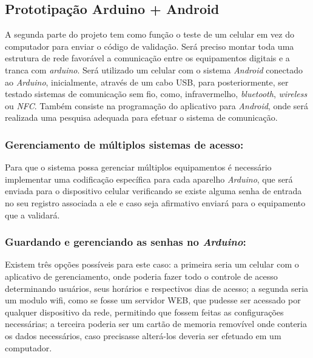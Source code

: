 \documentclass[12pt]{article}
\begin{document}
\subsection{Prototipação Arduino + Android}

	A segunda parte do projeto tem como função o teste de um celular em vez do computador para enviar o código de validação. Será preciso montar toda uma estrutura de rede favorável a comunicação entre os equipamentos digitais e a tranca com \textit{arduino}.\cite{igoe2011making} Será utilizado um celular com o sistema \textit{Android} conectado ao \textit{Arduino}, inicialmente, através de um cabo USB, para posteriormente, ser testado sistemas de comunicação sem fio, como, infravermelho, \textit{bluetooth}, \textit{wireless} ou \textit{NFC}. Também consiste na programação do aplicativo para \textit{Android}, onde será realizada uma pesquisa adequada para efetuar o sistema de comunicação.

\subsubsection{Gerenciamento de múltiplos sistemas de acesso: }
	Para que o sistema possa gerenciar múltiplos equipamentos é necessário implementar uma codificação específica para cada aparelho \textit{Arduino}, que será enviada para o dispositivo celular verificando se existe alguma senha de entrada no seu registro associada a ele e caso seja afirmativo enviará para o equipamento que a validará.  
	
	

\subsubsection{Guardando e gerenciando as senhas no \textit{Arduino}:}
	
	Existem três opções possíveis para este caso: a primeira seria um celular com o aplicativo de gerenciamento, onde poderia fazer todo o controle de acesso determinando usuários, seus horários e respectivos dias de acesso; a segunda seria um modulo wifi, como se fosse um servidor WEB, que pudesse ser acessado por qualquer dispositivo da rede, permitindo que fossem feitas as configurações necessárias; a terceira poderia ser um cartão de memoria removível onde conteria os dados necessários, caso precisasse alterá-los deveria ser efetuado em um computador. 
\end{document}
